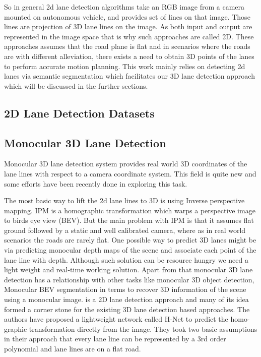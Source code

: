 So in general 2d lane detection algorithms take an RGB image from a camera mounted on autonomous vehicle, and provides set of lines on that image. Those lines are projection of 3D lane lines on the image. As both input and output are represented in the image space that is why such approaches are called 2D. These approaches assumes that the road plane is flat and in scenarios where the roads are with different alleviation, there exists a need to obtain 3D points of the lanes to perform accurate motion planning. This work mainly relies on detecting 2d lanes via semantic segmentation which facilitates our 3D lane detection approach which will be discussed in the further sections. 
        
        \subsection{2D Lane Detection Datasets}
        
        \subsection{Monocular 3D Lane Detection}
        Monocular 3D lane detection system provides real world 3D coordinates of the lane lines with respect to a camera coordinate system. This field is quite new and some efforts have been recently done in exploring this task. 
 
The most basic way to lift the 2d lane lines to 3D is using Inverse perspective mapping. IPM is a homographic transformation which warps a perspective image to birds eye view (BEV). But the main problem with IPM is that it assumes flat ground followed by a static and well calibrated camera, where as in real world scenarios the roads are rarely flat. One possible way to predict 3D lanes might be via predicting monocular depth maps of the scene and associate each point of the lane line with depth. Although such solution can be resource hungry we need a light weight and real-time working solution. Apart from that monocular 3D lane detection has a relationship with other tasks like monocular 3D object detection, Monocular BEV segmentation in terms to recover 3D information of the scene using a monocular image.
\cite{DBLP:journals/corr/abs-1802-05591} is a 2D lane detection approach and many of its idea formed a corner stone for the existing 3D lane detection based approaches. The authors have proposed a lightweight network called H-Net to predict the homo-graphic transformation directly from the image. They took two basic assumptions in their approach that every lane line can be represented by a 3rd order polynomial and lane lines are on a flat road. 

